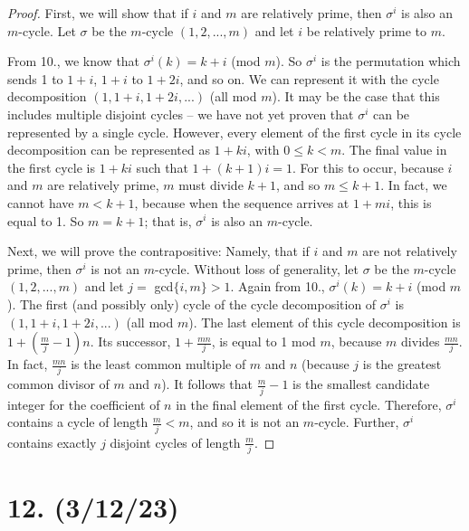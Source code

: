 \documentclass{article}
\begin{document}
\begin{proof}
    First, we will show that if $i$ and $m$ are relatively prime, then $\sigma^i$ is also an $m$-cycle. Let $\sigma$ be the $m$-cycle $(1, 2, ..., m)$ and let $i$ be relatively prime to $m$.

    From 10., we know that $\sigma^i(k) = k + i$ (mod $m$). So $\sigma^i$ is the permutation which sends 1 to $1 + i$, $1 + i$ to $1 + 2i$, and so on. We can represent it with the cycle decomposition $(1, 1 + i, 1 + 2i, ...)$ (all mod $m$). It may be the case that this includes multiple disjoint cycles -- we have not yet proven that $\sigma^i$ can be represented by a single cycle. However, every element of the first cycle in its cycle decomposition can be represented as $1 + ki$, with $0 \leq k < m$. The final value in the first cycle is $1 + ki$ such that $1 + (k + 1)i = 1$. For this to occur, because $i$ and $m$ are relatively prime, $m$ must divide $k + 1$, and so $m \leq k + 1$. In fact, we cannot have $m < k + 1$, because when the sequence arrives at $1 + mi$, this is equal to 1. So $m = k + 1$; that is, $\sigma^i$ is also an $m$-cycle.

    Next, we will prove the contrapositive: Namely, that if $i$ and $m$ are not relatively prime, then $\sigma^i$ is not an $m$-cycle. Without loss of generality, let $\sigma$ be the $m$-cycle $(1, 2, ..., m)$ and let $j = $ gcd$\{i, m\} > 1$. Again from 10., $\sigma^i(k) = k + i$ (mod $m$). The first (and possibly only) cycle of the cycle decomposition of $\sigma^i$ is $(1, 1 + i, 1 + 2i, ...)$ (all mod $m$). The last element of this cycle decomposition is $1 + (\frac{m}{j} - 1)n$. Its successor, $1 + \frac{mn}{j}$, is equal to 1 mod $m$, because $m$ divides $\frac{mn}{j}$. In fact, $\frac{mn}{j}$ is the least common multiple of $m$ and $n$ (because $j$ is the greatest common divisor of $m$ and $n$). It follows that $\frac{m}{j} - 1$ is the smallest candidate integer for the coefficient of $n$ in the final element of the first cycle. Therefore, $\sigma^i$ contains a cycle of length $\frac{m}{j} < m$, and so it is not an $m$-cycle. Further, $\sigma^i$ contains exactly $j$ disjoint cycles of length $\frac{m}{j}$.
\end{proof}

\section*{12. (3/12/23)}
\end{document}
